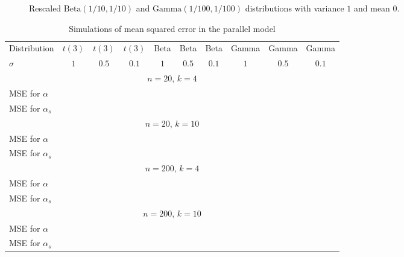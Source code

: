 \documentclass{article}
\theoremstyle{plain}
\theoremstyle{plain}
\theoremstyle{definition}
\theoremstyle{remark}
\theoremstyle{definition}
\theoremstyle{plain}
\theoremstyle{plain}
\theoremstyle{definition}
\begin{document}
\begin{figure}
	\centering     %
	\caption{Rescaled $\textrm{Beta}(1/10, 1/10)$ and $\textrm{Gamma}(1/100, 1/100)$ distributions with variance $1$ and mean $0$.}
	\label{fig::distributions}
\end{figure}




\begin{table}
    \centering
    \caption{Simulations of mean squared error in the parallel model}
    \begin{tabular}{lccccccccc}
    Distribution & $t(3)$ & $t(3)$ & $t(3)$ & Beta & Beta & Beta & Gamma & Gamma & Gamma\tabularnewline
    $\sigma$ & $1$ & $0.5$ & $0.1$ & $1$ & $0.5$ & $0.1$ & $1$ & $0.5$ & $0.1$\tabularnewline
    \multicolumn{10}{c}{$n=20$, $k=4$}\tabularnewline
    MSE for $\alpha$ &  &  &  &  &  &  &  &  & \tabularnewline
    MSE for $\alpha_{s}$ &  &  &  &  &  &  &  &  & \tabularnewline

    \multicolumn{10}{c}{$n=20$, $k=10$}\tabularnewline
    MSE for $\alpha$ &  &  &  &  &  &  &  &  & \tabularnewline
    MSE for $\alpha_{s}$ &  &  &  &  &  &  &  &  & \tabularnewline

    \multicolumn{10}{c}{$n=200$, $k=4$}\tabularnewline
    MSE for $\alpha$ &  &  &  &  &  &  &  &  & \tabularnewline
    MSE for $\alpha_{s}$ &  &  &  &  &  &  &  &  & \tabularnewline

    \multicolumn{10}{c}{$n=200$, $k=10$}\tabularnewline
    MSE for $\alpha$ &  &  &  &  &  &  &  &  & \tabularnewline
    MSE for $\alpha_{s}$ &  &  &  &  &  &  &  &  & \tabularnewline
    \end{tabular}
    \label{tab:my_label}
\end{table}
\end{document}
